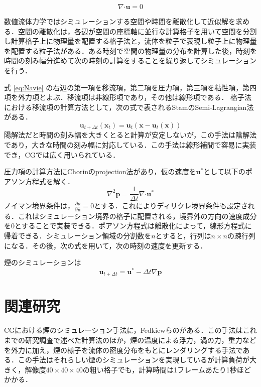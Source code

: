 \documentclass[10pt,a4paper,notitlepage,oneside,twocolumn]{abst_jsarticle}
\begin{document}
$$\nabla\boldsymbol{\cdot}\bm{u} = 0$$

数値流体力学ではシミュレーションする空間や時間を離散化して近似解を求める．空間の離散化は，各辺が空間の座標軸に並行な計算格子を用いて空間を分割し計算格子上に物理量を配置する格子法と，流体を粒子で表現し粒子上に物理量を配置する粒子法がある．ある時刻で空間の物理量の分布を計算した後，時刻を時間の刻み幅分進めて次の時刻の計算をすることを繰り返してシミュレーションを行う．

式 \ref{eq:Navie} の右辺の第一項を移流項，第二項を圧力項，第三項を粘性項，第四項を外力項とよぶ．移流項は非線形項であり，その他は線形項である．
格子法における移流項の計算方法として，次の式で表されるStamのSemi-Lagrangian法\cite{semi-Lagrangian}がある．
$$\bm{u}_{t+\Delta t}(\bm{x}_t) = \bm{u}_t(\bm{x}-\bm{u}_t(\bm{x}))$$
陽解法だと時間の刻み幅を大きくとると計算が安定しないが，この手法は陰解法であり，大きな時間の刻み幅に対応している．この手法は線形補間で容易に実装でき，CGでは広く用いられている．

圧力項の計算方法にChorinのprojection法\cite{projection}があり，仮の速度を$\bm{u}^*$として以下のポアソン方程式を解く．
\begin{equation}\label{eq:colin_p}
\nabla^2 \bm{p} =  \frac{1}{\Delta t}\nabla\boldsymbol{\cdot}\bm{u}^*
\end{equation} 
ノイマン境界条件は，$\frac{\partial p}{\partial \bm{n}} = 0$とする．これによりディリクレ境界条件も設定される．これはシミュレーション境界の格子に配置される，境界外の方向の速度成分を$0$とすることで実装できる．ポアソン方程式は離散化によって，線形方程式に帰着できる．シミュレーション領域の分割数を$n$とすると，行列は$n \times n$の疎行列になる．その後，次の式を用いて，次の時刻の速度を更新する．

煙のシミュレーションは
$$\bm{u}_{t+\Delta t} = \bm{u}^* - \Delta t \nabla \bm{p}$$

\section{関連研究}
CGにおける煙のシミュレーション手法に，Fedkiewらの\cite{fedkiew}がある．この手法はこれまでの研究調査で述べた計算法のほか，煙の温度による浮力，渦の力，重力などを外力に加え，煙の様子を流体の密度分布をもとにレンダリングする手法である．この手法はそれらしい煙のシミュレーションを実現しているが計算負荷が大きく，解像度$40\times40\times40$の粗い格子でも，計算時間は1フレームあたり1秒ほどかかる．
\end{document}
